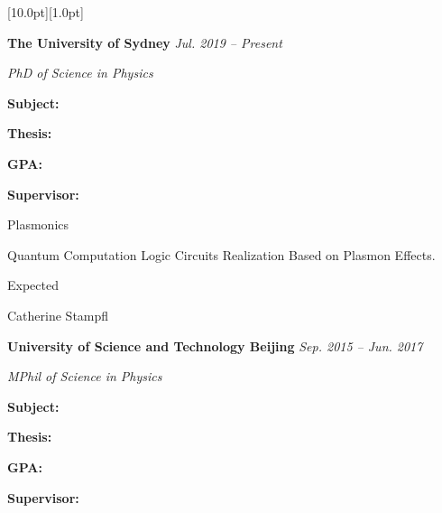 \documentclass[12pt,a4paper,utf8]{report}
\begin{document}
\begin{minipage}[t]{16cm}
    \colorbox{subtitlecolor}{\raisebox{0pt}[10.0pt][1.0pt]{
        \textcolor{white}{\textsf{}}}}
\end{minipage}\par
\vspace{0.2cm}\hspace{0.5cm}
\begin{minipage}[t]{15.0cm}
    {{\textbf{The University of Sydney}}}\hfill
    {\em{Jul. 2019 -- Present}}\par\vspace{0.1cm}
    {\qquad\em{PhD of Science in Physics}}\par
\end{minipage}\par
\vspace{0.1cm}
    \begin{minipage}[t]{4cm}
        \qquad \textbf{Subject:}\par
        \qquad \textbf{Thesis:}\par
        \qquad \par
        \qquad \textbf{GPA:}\par
        \qquad \textbf{Supervisor:}\par
    \end{minipage}
    \begin{minipage}[t]{11cm}
        Plasmonics\par
        Quantum Computation Logic Circuits Realization Based on Plasmon Effects.\par
        Expected\par
        Catherine Stampfl\par
    \end{minipage}\par
\vspace{0.2cm}\hspace{0.5cm}
\begin{minipage}[t]{15.0cm}
    {{\textbf{University of Science and Technology Beijing}}}\hfill
    {\em{Sep. 2015 -- Jun. 2017}}\par\vspace{0.1cm}
    {\qquad\em{MPhil of Science in Physics}}\par
\end{minipage}\par
\vspace{0.1cm}
    \begin{minipage}[t]{4cm}
        \qquad \textbf{Subject:}\par
        \qquad \textbf{Thesis:}\par
        \qquad \par
        \qquad \textbf{GPA:}\par
        \qquad \textbf{Supervisor:}\par
    \end{minipage}
\end{document}
